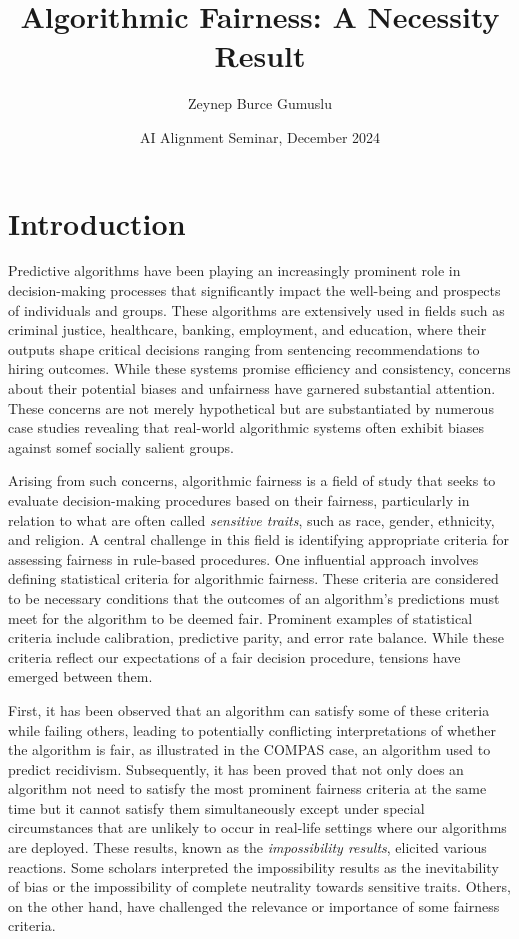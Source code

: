 \documentclass{article}
\title{Algorithmic Fairness: A Necessity Result}
\author{Zeynep Burce Gumuslu}
\date{AI Alignment Seminar, December 2024}
\begin{document}
\maketitle
\section{Introduction}

\cite{Chouldechova_2017}
\cite{Hedden_2021}
\cite{Kleinberg_2016}
\cite{Patty_Penn_2023}


Predictive algorithms have been playing an increasingly prominent role in decision-making processes that significantly impact the well-being and prospects of individuals and groups. These algorithms are extensively used in fields such as criminal justice, healthcare, banking, employment, and education, where their outputs shape critical decisions ranging from sentencing recommendations to hiring outcomes. While these systems promise efficiency and consistency, concerns about their potential biases and unfairness have garnered substantial attention. These concerns are not merely hypothetical but are substantiated by numerous case studies revealing that real-world algorithmic systems often exhibit biases against somef socially salient groups.

Arising from such concerns, algorithmic fairness is a field of study that seeks to evaluate decision-making procedures based on their fairness, particularly in relation to what are often called \textit{sensitive traits}, such as race, gender, ethnicity, and religion. A central challenge in this field is identifying appropriate criteria for assessing fairness in rule-based procedures. One influential approach involves defining statistical criteria for algorithmic fairness. These criteria are considered to be necessary conditions that the outcomes of an algorithm’s predictions must meet for the algorithm to be deemed fair. Prominent examples of statistical criteria include calibration, predictive parity, and error rate balance. While these criteria reflect our expectations of a fair decision procedure, tensions have emerged between them.

First, it has been observed that an algorithm can satisfy some of these criteria while failing others, leading to potentially conflicting interpretations of whether the algorithm is fair, as illustrated in the COMPAS case, an algorithm used to predict recidivism. Subsequently, it has been proved that not only does an algorithm not need to satisfy the most prominent fairness criteria at the same time but it cannot satisfy them simultaneously except under special circumstances that are unlikely to occur in real-life settings where our algorithms are deployed. These results, known as the \textit{impossibility results}, elicited various reactions. Some scholars interpreted the impossibility results as the inevitability of bias or the impossibility of complete neutrality towards sensitive traits. Others, on the other hand, have challenged the relevance or importance of some fairness criteria. 
\end{document}
